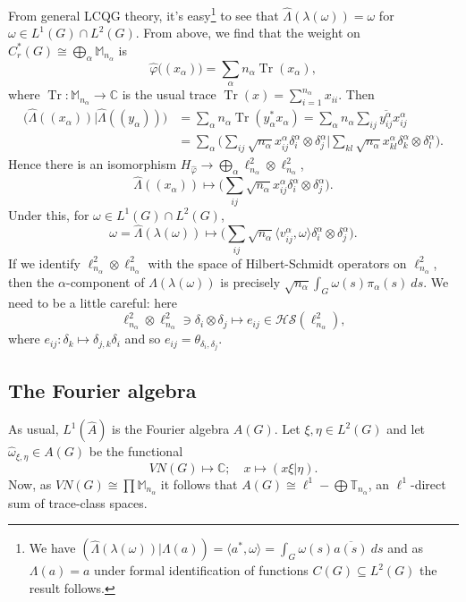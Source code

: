 \documentclass[twoside,a4paper,12pt]{article}
\theoremstyle{plain}
\theoremstyle{definition}
\newcommand{\ip}[2]{\langle #1,#2 \rangle}
\newcommand{\mc}{\mathcal}
\newcommand{\tr}{\operatorname{Tr}}
\begin{document}
From general LCQG theory, it's
easy\footnote{We have $(\hat\Lambda(\lambda(\omega))|\Lambda(a))
= \ip{a^*}{\omega} = \int_G \omega(s) \overline{a(s)} \ ds$ and as
$\Lambda(a)=a$ under formal identification of functions $C(G)\subseteq
L^2(G)$ the result follows.} to see
that $\hat\Lambda(\lambda(\omega)) = \omega$ for $\omega \in L^1(G)\cap L^2(G)$.
From above, we find that the weight on $C^*_r(G) \cong \bigoplus_\alpha
\mathbb M_{n_\alpha}$ is
\[ \hat\varphi\big( (x_\alpha) \big) = \sum_\alpha n_\alpha \tr(x_\alpha), \]
where $\tr:\mathbb M_{n_\alpha}\rightarrow\mathbb C$ is the usual trace
$\tr(x) =\sum_{i=1}^{n_\alpha} x_{ii}$.  Then
\begin{align*} \big( \hat\Lambda((x_\alpha)) \big| \hat\Lambda((y_\alpha)) \big)
&= \sum_\alpha n_\alpha \tr(y_\alpha^*x_\alpha)
= \sum_\alpha n_\alpha \sum_{ij} \overline{y^\alpha_{ij}} x^\alpha_{ij} \\
&= \sum_\alpha \Big(
\sum_{ij} \sqrt{n_\alpha} x^\alpha_{ij} \delta^\alpha_i\otimes\delta^\alpha_j
\Big|
\sum_{kl} \sqrt{n_\alpha} x^\alpha_{kl} \delta^\alpha_k\otimes\delta^\alpha_l
\Big).
\end{align*}
Hence there is an isomorphism $H_{\hat\varphi} \rightarrow
\bigoplus_\alpha \ell^2_{n_\alpha} \otimes \ell^2_{n_\alpha}$,
\[ \hat\Lambda((x_\alpha)) \mapsto \Big( 
\sum_{ij} \sqrt{n_\alpha} x^\alpha_{ij} \delta^\alpha_i\otimes\delta^\alpha_j
\Big). \]
Under this, for $\omega\in L^1(G)\cap L^2(G)$,
\[ \omega = \hat\Lambda(\lambda(\omega)) \mapsto
\Big( \sum_{ij} \sqrt{n_\alpha} \ip{v^\alpha_{ij}}{\omega}
\delta^\alpha_i\otimes\delta^\alpha_j \Big). \]
If we identify $\ell^2_{n_\alpha} \otimes \ell^2_{n_\alpha}$ with the space of
Hilbert-Schmidt operators on $\ell^2_{n_\alpha}$, then the $\alpha$-component
of $\hat\Lambda(\lambda(\omega))$ is precisely
$\sqrt{n_\alpha}\int_G \omega(s)\pi_\alpha(s) \ ds$.
We need to be a little careful: here
\[ \ell^2_{n_\alpha} \otimes \ell^2_{n_\alpha} \ni \delta_i \otimes
\delta_j \mapsto e_{ij} \in \mc{HS}(\ell^2_{n_\alpha}), \]
where $e_{ij}:\delta_k \mapsto \delta_{j,k} \delta_i$ and so
$e_{ij} = \theta_{\delta_i,\delta_j}$.



\subsection{The Fourier algebra}

As usual, $L^1(\hat A)$ is the Fourier algebra $A(G)$.  Let $\xi,\eta\in
L^2(G)$ and let $\hat\omega_{\xi,\eta} \in A(G)$ be the functional
\[ VN(G) \mapsto \mathbb C; \quad x\mapsto (x\xi|\eta). \]
Now, as $VN(G) \cong \prod \mathbb M_{n_\alpha}$ it follows that
$A(G) \cong \ell^1-\bigoplus \mathbb T_{n_\alpha}$, an $\ell^1$-direct sum
of trace-class spaces.
\end{document}
